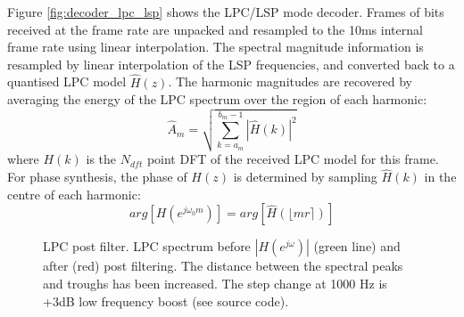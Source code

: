 \documentclass{article}
\begin{document}
Figure \ref{fig:decoder_lpc_lsp} shows the LPC/LSP mode decoder.  Frames of bits received at the frame rate are unpacked and resampled to the 10ms internal frame rate using linear interpolation.  The spectral magnitude information is resampled by linear interpolation of the LSP frequencies, and converted back to a quantised LPC model $\hat{H}(z)$.  The harmonic magnitudes are recovered by averaging the energy of the LPC spectrum over the region of each harmonic:
\begin{equation}
\hat{A}_m = \sqrt{ \sum_{k=a_m}^{b_m-1} | \hat{H}(k) |^2 }
\end{equation}
where $H(k)$ is the $N_{dft}$ point DFT of the received LPC model for this frame.  For phase synthesis, the phase of $H(z)$ is determined by sampling $\hat{H}(k)$ in the centre of each harmonic:
\begin{equation}
arg \left[ H(e^{j \omega_0 m}) \right] = arg \left[ \hat{H}(\lfloor m r \rceil) \right]
\end{equation}

\begin{figure} [h]
\caption{LPC post filter.  LPC spectrum before $|H(e^{j \omega})|$ (green line) and after (red) post filtering. The distance between the spectral peaks and troughs has been increased.  The step change at 1000 Hz is +3dB low frequency boost (see source code).}
\label{fig:hts2a_lpc_pf}
\begin{center}

\end{center}
\end{figure}
\end{document}
